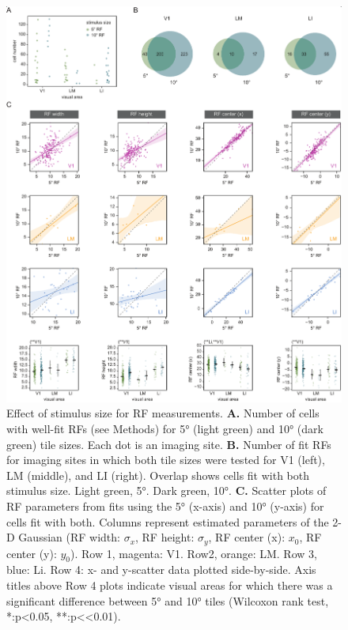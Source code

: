 \begin{figure}[t!]
\includegraphics[width=\textwidth]{figures/supplemental/fig_s6_rf5_v_rf10/fig_s6_rf5_rf10.pdf}
    \vspace{.1in}
    \caption[RF mapping stimuli]{Effect of stimulus size for RF measurements.
    \textbf{A.} Number of cells with well-fit RFs (see Methods) for \ang{5} (light green) and \ang{10} (dark green) tile sizes. Each dot is an imaging site.
    \textbf{B.} Number of fit RFs for imaging sites in which both tile sizes were tested for V1 (left), LM (middle), and LI (right). Overlap shows cells fit with both stimulus size. Light green, \ang{5}. Dark green, \ang{10}.
    \textbf{C.} Scatter plots of RF parameters from fits using the \ang{5} (x-axis) and \ang{10} (y-axis) for cells fit with both. Columns represent estimated parameters of the 2-D Gaussian (RF width: $\sigma_x$, RF height: $\sigma_y$, RF center (x): $x_0$, RF center (y): $y_0$). Row 1, magenta: V1. Row2, orange: LM. Row 3, blue: Li. Row 4: x- and y-scatter data plotted side-by-side. Axis titles above Row 4 plots indicate visual areas for which there was a significant difference between \ang{5} and \ang{10} tiles (Wilcoxon rank test, *:p<0.05, **:p<<0.01).
    \label{supfig:rf5_rf10}}
\end{figure}


